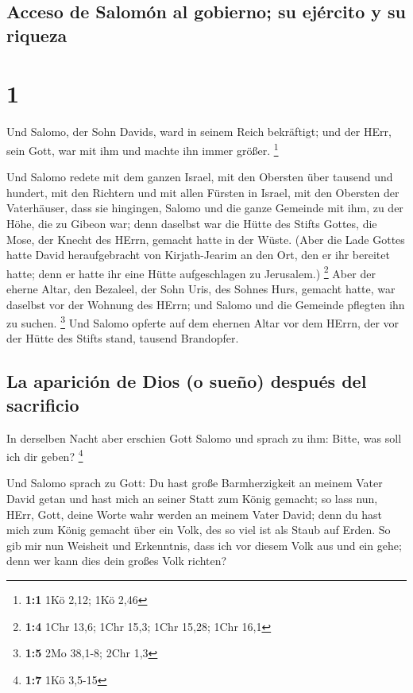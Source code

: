 \hypertarget{acceso-de-salomuxf3n-al-gobierno-su-ejuxe9rcito-y-su-riqueza}{%
\subsection{Acceso de Salomón al gobierno; su ejército y su
riqueza}\label{acceso-de-salomuxf3n-al-gobierno-su-ejuxe9rcito-y-su-riqueza}}

\hypertarget{section}{%
\section{1}\label{section}}

 Und Salomo, der Sohn Davids, ward in seinem Reich
bekräftigt; und der HErr, sein Gott, war mit ihm und machte ihn immer
größer. \footnote{\textbf{1:1} 1Kö 2,12; 1Kö 2,46}

 Und Salomo redete mit dem ganzen Israel, mit den Obersten
über tausend und hundert, mit den Richtern und mit allen Fürsten in
Israel, mit den Obersten der Vaterhäuser,  dass sie
hingingen, Salomo und die ganze Gemeinde mit ihm, zu der Höhe, die zu
Gibeon war; denn daselbst war die Hütte des Stifts Gottes, die Mose, der
Knecht des HErrn, gemacht hatte in der Wüste.  (Aber die
Lade Gottes hatte David heraufgebracht von Kirjath-Jearim an den Ort,
den er ihr bereitet hatte; denn er hatte ihr eine Hütte aufgeschlagen zu
Jerusalem.) \footnote{\textbf{1:4} 1Chr 13,6; 1Chr 15,3; 1Chr 15,28;
  1Chr 16,1}  Aber der eherne Altar, den Bezaleel, der
Sohn Uris, des Sohnes Hurs, gemacht hatte, war daselbst vor der Wohnung
des HErrn; und Salomo und die Gemeinde pflegten ihn zu suchen.
\footnote{\textbf{1:5} 2Mo 38,1-8; 2Chr 1,3}  Und Salomo
opferte auf dem ehernen Altar vor dem HErrn, der vor der Hütte des
Stifts stand, tausend Brandopfer.

\hypertarget{la-apariciuxf3n-de-dios-o-sueuxf1o-despuuxe9s-del-sacrificio}{%
\subsection{La aparición de Dios (o sueño) después del
sacrificio}\label{la-apariciuxf3n-de-dios-o-sueuxf1o-despuuxe9s-del-sacrificio}}

 In derselben Nacht aber erschien Gott Salomo und sprach
zu ihm: Bitte, was soll ich dir geben? \footnote{\textbf{1:7} 1Kö 3,5-15}

 Und Salomo sprach zu Gott: Du hast große Barmherzigkeit
an meinem Vater David getan und hast mich an seiner Statt zum König
gemacht;  so lass nun, HErr, Gott, deine Worte wahr werden
an meinem Vater David; denn du hast mich zum König gemacht über ein
Volk, des so viel ist als Staub auf Erden.  So gib mir
nun Weisheit und Erkenntnis, dass ich vor diesem Volk aus und ein gehe;
denn wer kann dies dein großes Volk richten?

